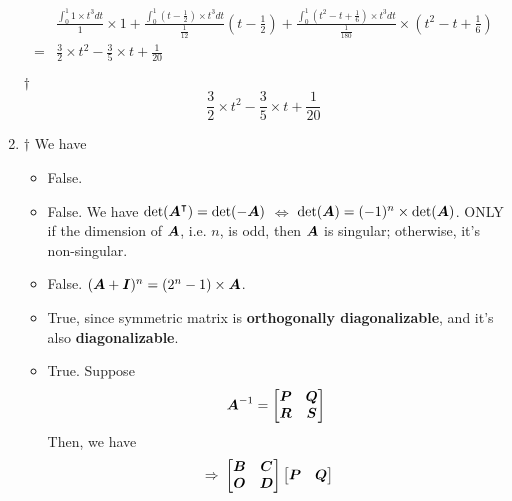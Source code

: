 \documentclass[a4paper,12pt]{article}
\begin{document}
\begin{enumerate}
\begin{equation}
\begin{aligned}
            & \frac{\int_{0}^{1}1 \times t^3dt}{1} \times 1 + \frac{\int_{0}^{1}(t - \frac{1}{2}) \times t^3dt}{\frac{1}{12}}(t - \frac{1}{2}) + \frac{\int_{0}^{1}(t^2 - t + \frac{1}{6}) \times t^3dt}{\frac{1}{180}} \times (t^2 - t + \frac{1}{6}) \\
            = & \frac{3}{2} \times t^2 - \frac{3}{5} \times t + \frac{1}{20}
        \end{aligned}
    \end{equation}
    \begin{answer}{$\dag$}\begin{equation}
            \frac{3}{2} \times t^2 - \frac{3}{5} \times t + \frac{1}{20}
        \end{equation}
    \end{answer}
    \item \begin{answer}{$\dag$} We have \begin{itemize}
            \item False.
            \item False. We have $\det(\boldsymbol{A}^\intercal) = \det(-\boldsymbol{A})$ $\iff$ $\det(\boldsymbol{A}) = (-1)^n \times \det(\boldsymbol{A})$. ONLY if the dimension of $\boldsymbol{A}$, i.e. $n$, is odd, then $\boldsymbol{A}$ is singular; otherwise, it's non-singular.
            \item False. $(\boldsymbol{A} + \boldsymbol{I})^n = (2^n - 1) \times \boldsymbol{A}$.
            \item True, since symmetric matrix is \textbf{orthogonally diagonalizable}, and it's also \textbf{diagonalizable}.
            \item True. Suppose \begin{equation}
                \boldsymbol{A}^{-1} = \begin{bmatrix}
                    \boldsymbol{P} & \boldsymbol{Q} \\
                    \boldsymbol{R} & \boldsymbol{S}
                \end{bmatrix}
            \end{equation} Then, we have \begin{equation}
                \begin{aligned}
                    \Rightarrow & \ \begin{bmatrix}
                        \boldsymbol{B} & \boldsymbol{C} \\
                        \boldsymbol{O} & \boldsymbol{D}
                    \end{bmatrix} \begin{bmatrix}
                        \boldsymbol{P} & \boldsymbol{Q} \\

\end{bmatrix}
\end{aligned}
\end{equation}
\end{itemize}
\end{answer}
\end{enumerate}
\end{document}
